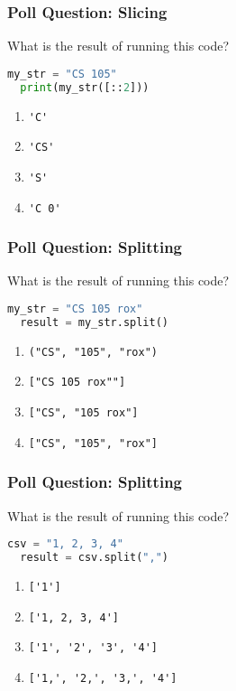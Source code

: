 \documentclass{beamer}
\begin{document}
%
%
\begin{frame}[fragile]
  \frametitle{Poll Question: Slicing}
  What is the result of running this code?
  \begin{lstlisting}[language=Python, autogobble]
  my_str = "CS 105"
  print(my_str([::2]))
  \end{lstlisting}
  \vfill
  \begin{enumerate}[A]
    \item \lstinline|'C'|
    \item \lstinline|'CS'|
    \item \lstinline|'S'|
    \item \lstinline|'C 0'|
  \end{enumerate}
\end{frame}



%
%
\begin{frame}[fragile]
  \frametitle{Poll Question: Splitting}
  What is the result of running this code?
  \begin{lstlisting}[language=Python, autogobble]
  my_str = "CS 105 rox"
  result = my_str.split()
  \end{lstlisting}
  \vfill
  \begin{enumerate}[A]
    \item \lstinline|("CS", "105", "rox")|
    \item \lstinline|["CS 105 rox""]|
    \item \lstinline|["CS", "105 rox"]|
    \item \lstinline|["CS", "105", "rox"]|
  \end{enumerate}
\end{frame}



%
%
\begin{frame}[fragile]
  \frametitle{Poll Question: Splitting}
  What is the result of running this code?
  \begin{lstlisting}[language=Python, autogobble]
  csv = "1, 2, 3, 4"
  result = csv.split(",")
  \end{lstlisting}
  \vfill
  \begin{enumerate}[A]
    \item \lstinline|['1']|
    \item \lstinline|['1, 2, 3, 4']|
    \item \lstinline|['1', '2', '3', '4']|
    \item \lstinline|['1,', '2,', '3,', '4']|
  \end{enumerate}
\end{frame}
\end{document}
